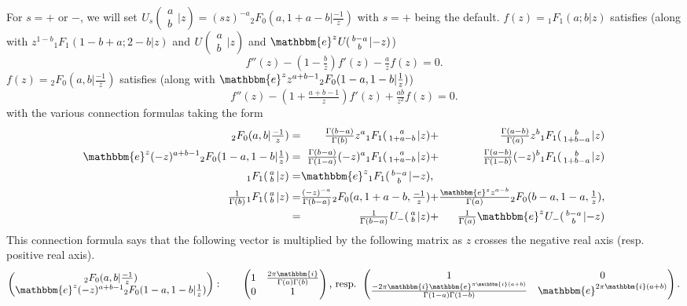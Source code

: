 \documentclass[12pt]{article}
\newcommand{\ee}[0] {\mathbbm{e}}
\newcommand{\ii}[0] {\mathbbm{i}}
\numberwithin{equation}{section}
\newcommand{\FFs}[6] {{}_{#1}{#2}_{#3} ( \begin{smallmatrix} #4 \\ #5 \end{smallmatrix} | {#6}  )}
\begin{document}
For $s=+$ or $-$, we will set $\FFs{}{U}{s}{a}{b}{z} = (s z)^{-a} {}_2 F_0(a,1+a-b|\tfrac{-1}{z})$ with $s=+$ being the default. $f(z) = {}_1 F_1(a;b|z)$ satisfies (along with $z^{1-b} {}_1 F_1(1-b+a;2-b|z)$ and $\FFs{}{U}{}{a}{b}{z}$ and $\ee^{z} \FFs{}{U}{}{b-a}{b}{-z}$)
\begin{equation*}
f''(z) - (1-\tfrac{b}{z})f'(z) - \tfrac{a}{z} f(z) = 0\text{.}
\end{equation*}
$f(z) = {}_2 F_0(a,b|\tfrac{-1}{z})$ satisfies (along with $\ee^{z} z^{a+b-1} {}_2 F_0(1-a,1-b|\frac{1}{z})$)
\begin{equation*}
f''(z) - (1+\tfrac{a+b-1}{z})f'(z) + \tfrac{a b}{z^2} f(z) = 0\text{.}
\end{equation*}
with the various connection formulas taking the form
\begin{equation}
\label{equ_2f0_recp}
\begin{alignedat}{7}
{}_2 F_0(a,b|\tfrac{-1}{z}) &= &\tfrac{\Gamma(b-a)}{\Gamma(b)} z^{a} \FFs{1}{F}{1}{a}{1+a-b}{z}& + &\tfrac{\Gamma(a-b)}{\Gamma(a)} z^{b} \FFs{1}{F}{1}{b}{1+b-a}{z}\\
\ee^{z} (-z)^{a+b-1} {}_2 F_0(1-a,1-b|\tfrac{1}{z}) &= & \tfrac{\Gamma(b-a)}{\Gamma(1-a)} (-z)^{a} \FFs{1}{F}{1}{a}{1+a-b}{z}& +
&\tfrac{\Gamma(a-b)}{\Gamma(1-b)} (-z)^{b} \FFs{1}{F}{1}{b}{1+b-a}{z}\\
\FFs{1}{F}{1}{a}{b}{z} &= &\ee^{z} \FFs{1}{F}{1}{b-a}{b}{-z}&\text{,}\\
\tfrac{1}{\Gamma(b)} \FFs{1}{F}{1}{a}{b}{z} &= &\tfrac{(-z)^{-a}}{\Gamma(b-a)} {}_2 F_{0}(a,1+a-b,\tfrac{-1}{z})& +
&\tfrac{\ee^z z^{a-b}}{\Gamma(a)} {}_2 F_{0}(b-a,1-a,\tfrac{1}{z})\text{,}\\
&= &\tfrac{1}{\Gamma(b-a)} \FFs{}{U}{-}{a}{b}{z}& + &\tfrac{1}{\Gamma(a)} \ee^{z} \FFs{}{U}{-}{b-a}{b}{-z}&
\end{alignedat}
\end{equation}
This connection formula says that the following vector is multiplied by the following matrix as $z$ crosses the negative real axis (resp. positive real axis).
\begin{equation}
\label{equ_2f0_branch}
\begin{pmatrix}
{}_2 F_0(a, b | \tfrac{-1}{z})\\
\ee^{z} (-z)^{a+b-1} {}_2 F_0(1-a, 1-b | \tfrac{1}{z})
\end{pmatrix}
: \quad \quad
\begin{pmatrix}
1 & \frac{2\pi \ii}{\Gamma(a)\Gamma(b)} \\
0 & 1
\end{pmatrix}
\text{,  resp. }
\begin{pmatrix}
1 & 0 \\
\frac{-2\pi \ii \ee^{\pi \ii (a+b)}}{\Gamma(1-a)\Gamma(1-b)} & \ee^{2\pi \ii (a+b)}
\end{pmatrix}\text{.}
\end{equation}
\end{document}
